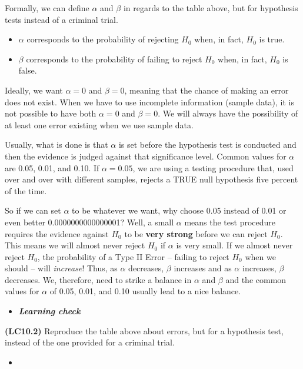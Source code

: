 \documentclass[12pt, krantz2,]{krantz}
\providecommand{\tightlist}{%
  \setlength{\itemsep}{0pt}\setlength{\parskip}{0pt}}
\newenvironment{rmdblock}[1]
  {\begin{shaded*}
  \begin{itemize}
  \renewcommand{\labelitemi}{
    \raisebox{-.7\height}[0pt][0pt]{
    }
  }
  \item
  }
  {
  \end{itemize}
  \end{shaded*}
  }
\newenvironment{learncheck}
  {\begin{rmdblock}{warning}}
  {\end{rmdblock}}
\begin{document}
Formally, we can define \(\alpha\) and \(\beta\) in regards to the table above, but for hypothesis tests instead of a criminal trial.

\begin{itemize}
\tightlist
\item
  \(\alpha\) corresponds to the probability of rejecting \(H_0\) when, in fact, \(H_0\) is true.
\item
  \(\beta\) corresponds to the probability of failing to reject \(H_0\) when, in fact, \(H_0\) is false.
\end{itemize}

Ideally, we want \(\alpha = 0\) and \(\beta = 0\), meaning that the chance of making an error does not exist. When we have to use incomplete information (sample data), it is not possible to have both \(\alpha = 0\) and \(\beta = 0\). We will always have the possibility of at least one error existing when we use sample data.

Usually, what is done is that \(\alpha\) is set before the hypothesis test is conducted and then the evidence is judged against that significance level. Common values for \(\alpha\) are 0.05, 0.01, and 0.10. If \(\alpha = 0.05\), we are using a testing procedure that, used over and over with different samples, rejects a TRUE null hypothesis five percent of the time.

So if we can set \(\alpha\) to be whatever we want, why choose 0.05 instead of 0.01 or even better 0.0000000000000001? Well, a small \(\alpha\) means the test procedure requires the evidence against \(H_0\) to be \textbf{very strong} before we can reject \(H_0\). This means we will almost never reject \(H_0\) if \(\alpha\) is very small. If we almost never reject \(H_0\), the probability of a Type II Error -- failing to reject \(H_0\) when we should -- will \emph{increase}! Thus, as \(\alpha\) decreases, \(\beta\) increases and as \(\alpha\) increases, \(\beta\) decreases. We, therefore, need to strike a balance in \(\alpha\) and \(\beta\) and the common values for \(\alpha\) of 0.05, 0.01, and 0.10 usually lead to a nice balance.

\begin{learncheck}
\textbf{\emph{Learning check}}
\end{learncheck}

\textbf{(LC10.2)} Reproduce the table above about errors, but for a hypothesis test, instead of the one provided for a criminal trial.

\begin{learncheck}

\end{learncheck}
\end{document}
